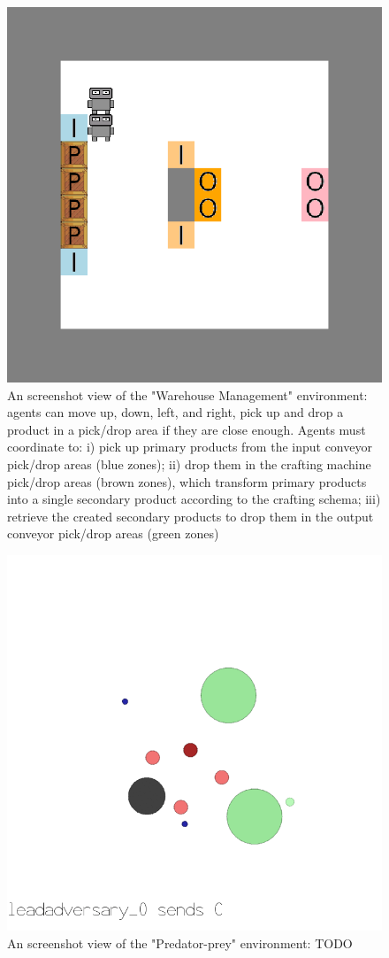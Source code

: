 \documentclass[pdflatex,sn-mathphys-num]{sn-jnl}%
\theoremstyle{thmstyleone}%
\theoremstyle{thmstyletwo}%
\theoremstyle{thmstylethree}%
\begin{document}
\begin{figure}[h!]
  \centering
  \includegraphics[width=0.7\linewidth]{figures/wm.png}
  \caption{An screenshot view of the "Warehouse Management" environment: agents can move up, down, left, and right, pick up and drop a product in a pick/drop area if they are close enough. Agents must coordinate to: i) pick up primary products from the input conveyor pick/drop areas (blue zones); ii) drop them in the crafting machine pick/drop areas (brown zones), which transform primary products into a single secondary product according to the crafting schema; iii) retrieve the created secondary products to drop them in the output conveyor pick/drop areas (green zones)}
  \label{fig:warehouse}
\end{figure}

  \begin{figure}[h!]
    \centering
    \includegraphics[width=0.7\linewidth]{figures/predator_prey.png}
    \caption{An screenshot view of the "Predator-prey" environment: TODO}
    \label{fig:predator_prey}
  \end{figure}
\end{document}
